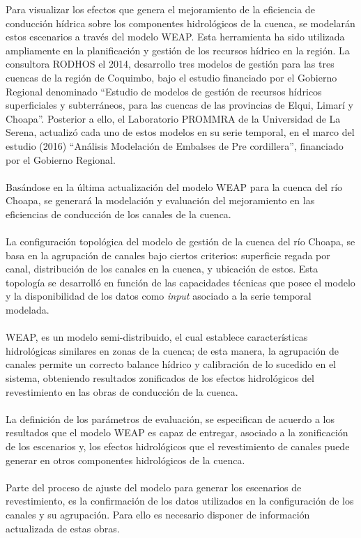 \documentclass[]{article}
\begin{document}
Para visualizar los efectos que genera el mejoramiento de la eficiencia de conducción hídrica sobre los componentes hidrológicos de la cuenca, se modelarán estos escenarios a través del modelo WEAP. Esta herramienta ha sido utilizada ampliamente en la planificación y gestión de los recursos hídrico en la región. La consultora RODHOS el 2014, desarrollo tres modelos de gestión para las tres cuencas de la región de Coquimbo, bajo el estudio financiado por el Gobierno Regional denominado “Estudio de modelos de gestión de recursos hídricos superficiales y subterráneos, para las cuencas de las provincias de Elqui, Limarí y Choapa”. Posterior a ello, el Laboratorio PROMMRA de la Universidad de La Serena, actualizó cada uno de estos modelos en su serie temporal, en el marco del estudio (2016) “Análisis Modelación de Embalses de Pre cordillera”, financiado por el Gobierno Regional.\\
\\
Basándose en la última actualización del modelo WEAP para la cuenca del río Choapa, se generará la modelación y evaluación del mejoramiento en las eficiencias de conducción de los canales de la cuenca.\\
\\
La configuración topológica del modelo de gestión de la cuenca del río Choapa, se basa en la agrupación de canales bajo ciertos criterios: superficie regada por canal, distribución de los canales en la cuenca, y ubicación de estos. Esta topología se desarrolló en función de las capacidades técnicas que posee el modelo y la disponibilidad de los datos como \textit{input} asociado a la serie temporal modelada.\\ 
 \\
WEAP, es un modelo semi-distribuido, el cual establece características hidrológicas similares en zonas de la cuenca; de esta manera, la agrupación de canales permite un correcto balance hídrico y calibración de lo sucedido en el sistema, obteniendo resultados zonificados de los efectos hidrológicos del revestimiento en las obras de conducción de la cuenca.\\
\\
La definición de los parámetros de evaluación, se especifican de acuerdo a los resultados que el modelo WEAP es capaz de entregar, asociado a la zonificación de los escenarios y, los efectos hidrológicos que el revestimiento de canales puede generar en otros componentes hidrológicos de la cuenca.\\
\\
Parte del proceso de ajuste del modelo para generar los escenarios de revestimiento, es la confirmación de los datos utilizados en la configuración de los canales y su agrupación. Para ello es necesario disponer de información actualizada de estas obras.\\
\end{document}

